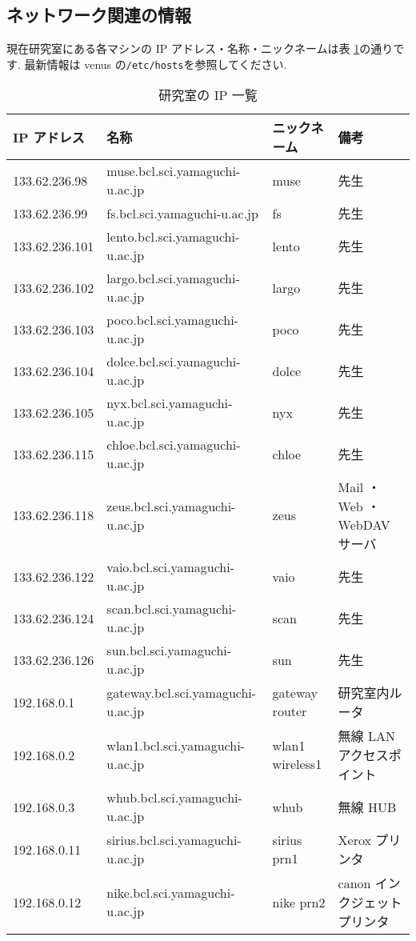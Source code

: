 \documentclass{jarticle}
\begin{document}
\subsection{ネットワーク関連の情報}

現在研究室にある各マシンの IP アドレス・名称・ニックネームは表
\ref{tab:IP}の通りです.
最新情報は venus の\verb|/etc/hosts|を参照してください.
{\small
\begin{table}[tbp]
\centering
\caption{研究室の IP 一覧 } \label{tab:IP}
\begin{tabular}[t]{llll}\hline
IP アドレス &	名称 &					ニックネーム &
備考 \\ \hline
133.62.236.98 &	muse.bcl.sci.yamaguchi-u.ac.jp &	muse & 先生\\
133.62.236.99 &	fs.bcl.sci.yamaguchi-u.ac.jp &	fs & 先生\\
133.62.236.101 &lento.bcl.sci.yamaguchi-u.ac.jp&	lento & 先生\\
133.62.236.102 &largo.bcl.sci.yamaguchi-u.ac.jp &	largo & 先生\\
133.62.236.103 &poco.bcl.sci.yamaguchi-u.ac.jp &	poco & 先生\\
133.62.236.104 &dolce.bcl.sci.yamaguchi-u.ac.jp &	dolce & 先生\\
133.62.236.105 &nyx.bcl.sci.yamaguchi-u.ac.jp   &       nyx & 先生\\
133.62.236.115 &chloe.bcl.sci.yamaguchi-u.ac.jp &	chloe & 先生\\
133.62.236.118 &zeus.bcl.sci.yamaguchi-u.ac.jp &	zeus & Mail ・ Web ・ WebDAV サーバ\\
133.62.236.122 &vaio.bcl.sci.yamaguchi-u.ac.jp &	vaio & 先生\\
133.62.236.124 &scan.bcl.sci.yamaguchi-u.ac.jp &	scan & 先生\\
133.62.236.126 &sun.bcl.sci.yamaguchi-u.ac.jp &		sun & 先生\\
\hline
192.168.0.1 &	gateway.bcl.sci.yamaguchi-u.ac.jp &	gateway router & 研究室内ルータ\\
192.168.0.2 &	wlan1.bcl.sci.yamaguchi-u.ac.jp &	wlan1 wireless1 & 無線 LAN アクセスポイント\\
192.168.0.3 &	whub.bcl.sci.yamaguchi-u.ac.jp &	whub & 無線 HUB\\
192.168.0.11 &	sirius.bcl.sci.yamaguchi-u.ac.jp &	sirius prn1 &	Xerox プリンタ \\
192.168.0.12 &	nike.bcl.sci.yamaguchi-u.ac.jp &	nike prn2 &	canon インクジェットプリンタ \\

\end{tabular}
\end{table}}
\end{document}
